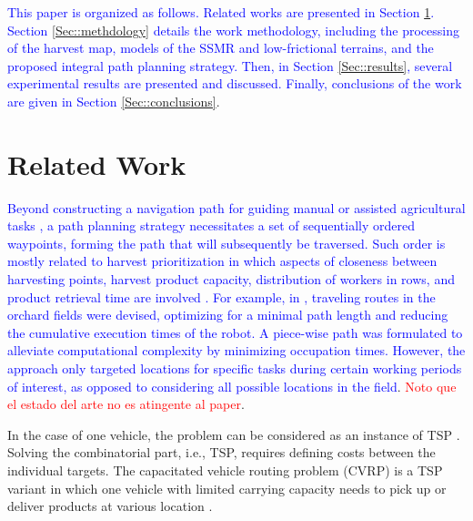 \documentclass[conference]{IEEEtran}
\begin{document}
\textcolor{blue}{This paper is organized as follows. Related works are presented in Section \ref{Sec::state_art}. Section \ref{Sec::methdology} details the work methodology, including the processing of the harvest map, models of the SSMR and low-frictional terrains, and the proposed integral path planning strategy. Then, in Section \ref{Sec::results}, several experimental results are presented and discussed. Finally, conclusions of the work are given in Section \ref{Sec::conclusions}}.



\section{Related Work}
\label{Sec::state_art}
\textcolor{blue}{Beyond constructing a navigation path for guiding manual or assisted agricultural tasks \cite{Janos2021}, a path planning strategy necessitates a set of sequentially ordered waypoints, forming the path that will subsequently be traversed. Such order is mostly related to harvest prioritization in which aspects of closeness between harvesting points, harvest product capacity, distribution of workers in rows, and product retrieval time are involved \cite{GUEVARA2020}. For example, in  \cite{Xie2020}, traveling routes in the orchard fields were devised, optimizing for a minimal path length and reducing the cumulative execution times of the robot. A piece-wise path was formulated to alleviate computational complexity by minimizing occupation times. However, the approach only targeted locations for specific tasks during certain working periods of interest, as opposed to considering all possible locations in the field}. \textcolor{red}{Noto que el estado del arte no es atingente al paper}.

In the case of one vehicle, the problem can be considered as an instance of TSP \cite{agriculture12070986, 9896838, Janos2021}. Solving the combinatorial part, i.e., TSP, requires deﬁning costs between the individual targets. The capacitated vehicle routing problem (CVRP) is a TSP variant in which one vehicle with limited carrying capacity needs to pick up or deliver products at various location \cite{Praveen2022, KHAJEPOUR2020105401}.
\end{document}
